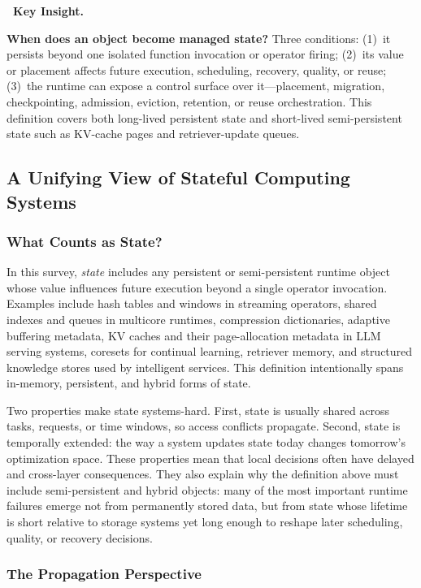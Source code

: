 \documentclass[acmsmall,screen,review]{acmart}
\newenvironment{keybox}{%
  \vspace{6pt}\noindent
  \begin{lrbox}{\keyboxcontent}
  \begin{minipage}{\dimexpr\linewidth-2\fboxsep-2\fboxrule\relax}
  \raggedright
  \textbf{\faLightbulbO\ \textcolor{keyborder}{Key Insight.}}\par\smallskip
}{%
  \end{minipage}
  \end{lrbox}
  \fcolorbox{keyborder}{keybg}{\usebox{\keyboxcontent}}%
  \vspace{6pt}%
}
\begin{document}
\begin{keybox}
\textbf{When does an object become managed state?} Three conditions: (1)~it persists beyond one isolated function invocation or operator firing; (2)~its value or placement affects future execution, scheduling, recovery, quality, or reuse; (3)~the runtime can expose a control surface over it---placement, migration, checkpointing, admission, eviction, retention, or reuse orchestration. This definition covers both long-lived persistent state and short-lived semi-persistent state such as KV-cache pages and retriever-update queues.
\end{keybox}



\subsection{A Unifying View of Stateful Computing Systems}

\subsubsection{What Counts as State?}

In this survey, \emph{state} includes any persistent or semi-persistent runtime object whose value influences future execution beyond a single operator invocation. Examples include hash tables and windows in streaming operators, shared indexes and queues in multicore runtimes, compression dictionaries, adaptive buffering metadata, KV caches and their page-allocation metadata in LLM serving systems, coresets for continual learning, retriever memory, and structured knowledge stores used by intelligent services. This definition intentionally spans in-memory, persistent, and hybrid forms of state.

Two properties make state systems-hard. First, state is usually shared across tasks, requests, or time windows, so access conflicts propagate. Second, state is temporally extended: the way a system updates state today changes tomorrow's optimization space. These properties mean that local decisions often have delayed and cross-layer consequences. They also explain why the definition above must include semi-persistent and hybrid objects: many of the most important runtime failures emerge not from permanently stored data, but from state whose lifetime is short relative to storage systems yet long enough to reshape later scheduling, quality, or recovery decisions.

\subsubsection{The Propagation Perspective}
\end{document}
